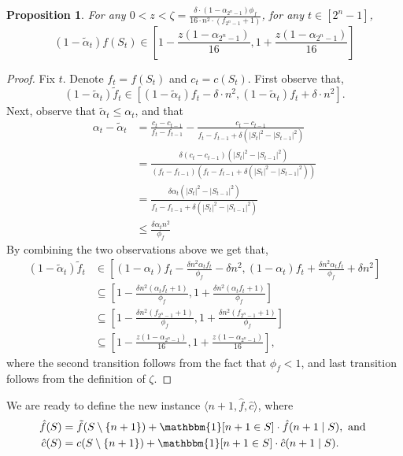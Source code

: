 \documentclass[11pt]{article}
\newtheorem{proposition}{Proposition}
\newcommand{\inst}[3]{\langle #1, #2, #3 \rangle}
\newcommand{\indicator}[1]{\mathbbm{1}[{#1}]}
\newcommand{\tf}{\tilde{f}}
\newcommand{\talpha}{\tilde{\alpha}}
\newcommand{\hf}{\hat{f}}
\newcommand{\hc}{\hat{c}}
\begin{document}
\begin{proposition}\label{prop:eps_for_revenue_sup_f}
For any $0 < z < \zeta = \frac{\delta \cdot (1-\alpha_{2^n-1})\phi_f}{16\cdot n^2 \cdot (f_{2^n-1}+1)}$, for any $t \in [2^n-1]$, 
$$
(1-\talpha_t)f(S_t) \in \left[1 - \frac{z(1-\alpha_{2^n-1})}{16}, 1 + \frac{z(1-\alpha_{2^n-1})}{16} \right]
$$
\end{proposition}
\begin{proof}
    Fix $t$. Denote $f_t = f(S_t)$ and $c_t = c(S_t)$.
    First observe that,
    $$
    (1-\talpha_t)\tf_t \in [(1-\talpha_t)f_t - \delta \cdot n^2, (1-\talpha_t)f_t + \delta \cdot n^2].
    $$
    Next, observe that $\talpha_t \le \alpha_t$, and that
    \begin{align*}
        \alpha_t - \talpha_t
        &=
        \frac{c_t-c_{t-1}}{f_t-f_{t-1}} - \frac{c_t-c_{t-1}}{f_t-f_{t-1} + \delta(|S_t|^2-|S_{t-1}|^2)}\\
        &=
        \frac{\delta(c_t-c_{t-1})(|S_t|^2-|S_{t-1}|^2)}{(f_t-f_{t-1})(f_t-f_{t-1} + \delta(|S_t|^2-|S_{t-1}|^2))} \\
        &=\frac{\delta\alpha_t(|S_t|^2-|S_{t-1}|^2)}{f_t-f_{t-1} + \delta(|S_t|^2-|S_{t-1}|^2)} \\
        &\le \frac{\delta \alpha_t n^2}{\phi_f}
    \end{align*}
    By combining the two observations above we get that,
    \begin{align*}
    (1-\talpha_t)\tf_t 
    &\in
    \left[(1-\alpha_t)f_t - \frac{\delta n^2\alpha_t f_t}{\phi_f} - \delta n^2,  (1-\alpha_t)f_t + \frac{\delta n^2\alpha_t f_t}{\phi_f} + \delta n^2\right] \\
    &\subseteq
    \left[1 - \frac{\delta n^2(\alpha_t f_t+1)}{\phi_f},  1 + \frac{\delta n^2(\alpha_t f_t+1)}{\phi_f}\right] \\
    &\subseteq
    \left[1 - \frac{\delta n^2(f_{2^n-1}+1)}{\phi_f},  1 + \frac{\delta n^2(f_{2^n-1}+1)}{\phi_f}\right] \\
    &\subseteq
    \left[1 - \frac{z(1-\alpha_{2^n-1})}{16},  1 + \frac{z(1-\alpha_{2^n-1})}{16}\right],
    \end{align*}
    where the second transition follows from the fact that $\phi_f < 1$, and  last transition follows from the definition of $\zeta$.
\end{proof}
We are ready to define the new instance $\inst{n+1}{\hf}{\hc}$, where 
\begin{align*}
\hf(S)&=\tf(S\setminus\{n+1\})+\indicator{n+1 \in S}\cdot\hf(n+1 \mid S), \text{ and } \\
\hc(S)&=c(S\setminus\{n+1\})+\indicator{n+1 \in S}\cdot\hc(n+1 \mid S).
\end{align*}
\end{document}
